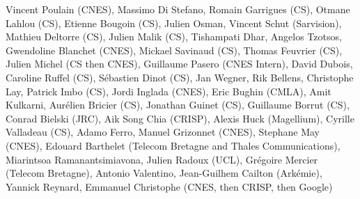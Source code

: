 Vincent Poulain (CNES), Massimo Di Stefano, Romain Garrigues (CS), Otmane Lahlou (CS), Etienne Bougoin (CS), Julien Osman, Vincent Schut (Sarvision), Mathieu Deltorre (CS), Julien Malik (CS), Tishampati Dhar, Angelos Tzotsos, Gwendoline Blanchet (CNES), Mickael Savinaud (CS), Thomas Feuvrier (CS), Julien Michel (CS then CNES), Guillaume Pasero (CNES Intern), David Dubois, Caroline Ruffel (CS), S\'ebastien Dinot (CS), Jan Wegner, Rik Bellens, Christophe Lay, Patrick Imbo (CS), Jordi Inglada (CNES), Eric Bughin (CMLA), Amit Kulkarni, Aur\'elien Bricier (CS), Jonathan Guinet (CS), Guillaume Borrut (CS), Conrad Bielski (JRC), Aik Song Chia (CRISP), Alexis Huck (Magellium), Cyrille Valladeau (CS), Adamo Ferro, Manuel Grizonnet (CNES), Stephane May (CNES), Edouard Barthelet (Telecom Bretagne and Thales Communications), Miarintsoa Ramanantsimiavona, Julien Radoux (UCL), Gr\'egoire Mercier (Telecom Bretagne), Antonio Valentino, Jean-Guilhem Cailton (Ark\'emie), Yannick Reynard, Emmanuel Christophe (CNES, then CRISP, then Google)